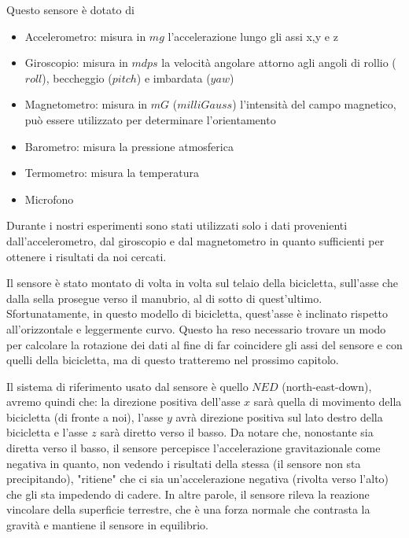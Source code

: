 \documentclass[class=article]{standalone}
\begin{document}
	Questo sensore è dotato di
	\begin{itemize}
		\item Accelerometro: misura in \(mg\) l'accelerazione lungo gli assi x,y e z
		\item Giroscopio: misura in \(mdps\) la velocità angolare attorno agli angoli di rollio (\(roll\)), beccheggio (\(pitch\)) e imbardata (\(yaw\))
		\item Magnetometro: misura in \(mG\) (\(milli Gauss\)) l'intensità del campo magnetico, può essere utilizzato per determinare l'orientamento
		\item Barometro: misura la pressione atmosferica
		\item Termometro: misura la temperatura
		\item Microfono
	\end{itemize}
	
	Durante i nostri esperimenti sono stati utilizzati solo i dati provenienti dall'accelerometro, dal giroscopio e dal magnetometro in quanto sufficienti per ottenere i risultati da noi cercati.
		
	Il sensore è stato montato di volta in volta sul telaio della bicicletta, sull'asse che dalla sella prosegue verso il manubrio, al di sotto di quest'ultimo. Sfortunatamente, in questo modello di bicicletta, quest'asse è inclinato rispetto all'orizzontale e leggermente curvo. Questo ha reso necessario trovare un modo per calcolare la rotazione dei dati al fine di far coincidere gli assi del sensore e con quelli della bicicletta, ma di questo tratteremo nel prossimo capitolo.\hfill\break
	
	Il sistema di riferimento usato dal sensore è quello \(NED\) (north-east-down), avremo quindi che: la direzione positiva dell'asse \(x\) sarà quella di movimento della bicicletta (di fronte a noi), l'asse \(y\) avrà direzione positiva sul lato destro della bicicletta e l'asse \(z\) sarà diretto verso il basso.
	Da notare che, nonostante sia diretta verso il basso, il sensore percepisce l'accelerazione gravitazionale come negativa in quanto, non vedendo i risultati della stessa (il sensore non sta precipitando), "ritiene" che ci sia un'accelerazione negativa (rivolta verso l'alto) che gli sta impedendo di cadere. 
	In altre parole, il sensore rileva la reazione vincolare della superficie terrestre, che è una forza normale che contrasta la gravità e mantiene il sensore in equilibrio.
	
	
	
\end{document}
